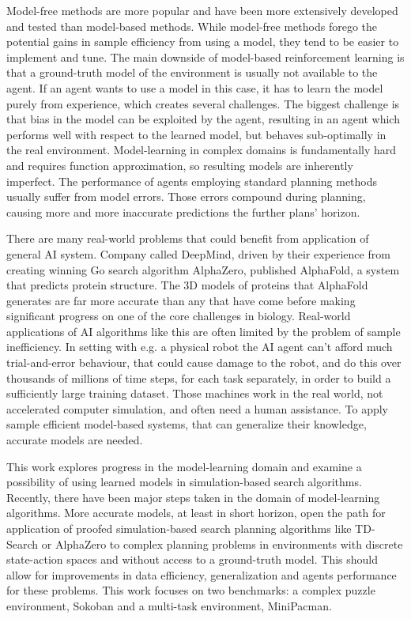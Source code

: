 Model-free methods are more popular and have been more extensively developed and tested than model-based methods. While model-free methods forego the potential gains in sample efficiency from using a model, they tend to be easier to implement and tune. The main downside of model-based reinforcement learning is that a ground-truth model of the environment is usually not available to the agent. If an agent wants to use a model in this case, it has to learn the model purely from experience, which creates several challenges. The biggest challenge is that bias in the model can be exploited by the agent, resulting in an agent which performs well with respect to the learned model, but behaves sub-optimally in the real environment. Model-learning in complex domains is fundamentally hard and requires function approximation, so resulting models are inherently imperfect. The performance of agents employing standard planning methods usually suffer from model errors. Those errors compound during planning, causing more and more inaccurate predictions the further plans' horizon.

There are many real-world problems that could benefit from application of general AI system. Company called DeepMind, driven by their experience from creating winning Go search algorithm AlphaZero\cite{Algo.AlphaZero}, published AlphaFold\cite{Algo.AlphaFold}, a system that predicts protein structure. The 3D models of proteins that AlphaFold generates are far more accurate than any that have come before making significant progress on one of the core challenges in biology. Real-world applications of AI algorithms like this are often limited by the problem of sample inefficiency. In setting with e.g. a physical robot the AI agent can't afford much trial-and-error behaviour, that could cause damage to the robot, and do this over thousands of millions of time steps, for each task separately, in order to build a sufficiently large training dataset. Those machines work in the real world, not accelerated computer simulation, and often need a human assistance. To apply sample efficient model-based systems, that can generalize their knowledge, accurate models are needed.

This work explores progress in the model-learning domain and examine a possibility of using learned models in simulation-based search algorithms. Recently, there have been major steps taken in the domain of model-learning algorithms\cite{Algo.RecurrentEnvSim}\cite{Algo.JointFrameRewardPrediction}\cite{Algo.FastGenerativeModels}\cite{Algo.PlaNet}. More accurate models, at least in short horizon, open the path for application of proofed simulation-based search planning algorithms like TD-Search\cite{Algo.TDSearch} or AlphaZero\cite{Algo.AlphaZero} to complex planning problems in environments with discrete state-action spaces and without access to a ground-truth model. This should allow for improvements in data efficiency, generalization and agents performance for these problems. This work focuses on two benchmarks: a complex puzzle environment, Sokoban and a multi-task environment, MiniPacman.
